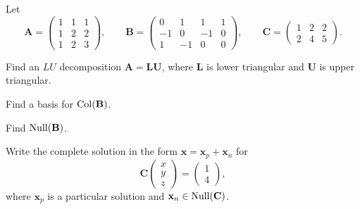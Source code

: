 \documentclass[11pt,oneside]{article}
\begin{document}
\begin{problem}
Let
\[
\mathbf A=
\begin{pmatrix}
1&1&1\\
1&2&2\\
1&2&3
\end{pmatrix},
\qquad
\mathbf B=
\begin{pmatrix}
0&1&1&1\\
-1&0&-1&0\\
1&-1&0&0
\end{pmatrix},
\qquad
\mathbf C=
\begin{pmatrix}
1&2&2\\
2&4&5
\end{pmatrix}.
\]
\begin{problemsubparts}
\item Find an $LU$ decomposition $\mathbf A=\mathbf L\mathbf U$, where $\mathbf L$ is lower triangular and $\mathbf U$ is upper triangular.
\item Find a basis for $\operatorname{Col}(\mathbf B)$.
\item Find $\operatorname{Null}(\mathbf B)$.
\item Write the complete solution in the form $\mathbf x=\mathbf x_p+\mathbf x_n$ for
\[
\mathbf C
\begin{pmatrix}
x\\y\\z
\end{pmatrix}
=
\begin{pmatrix}
1\\4
\end{pmatrix},
\]
where $\mathbf x_p$ is a particular solution and $\mathbf x_n\in\operatorname{Null}(\mathbf C)$.
\end{problemsubparts}
\end{problem}
\end{document}
